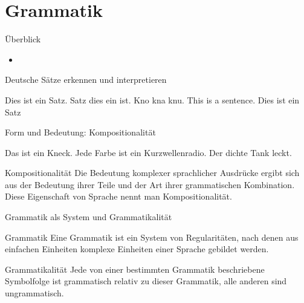 \section{Grammatik}


\begin{frame}
  {Überblick}
  \begin{itemize}[<+->]
    \item \citet{Schaefer2018b}
  \end{itemize}
\end{frame}

\begin{frame}
  {Deutsche Sätze erkennen und interpretieren}
  \pause
  \begin{exe}
    \ex Dies ist ein Satz.
  \pause
    \ex Satz dies ein ist.
  \pause
    \ex Kno kna knu.
  \pause
    \ex This is a sentence.
  \pause
    \vspace{\baselineskip}
    \ex Dies ist ein Satz
  \end{exe}
\end{frame}


\begin{frame}
  {Form und Bedeutung: Kompositionalität}
  \begin{exe}
    \ex Das ist ein Kneck.
    \pause
    \vspace{\baselineskip}
  \ex Jede Farbe ist ein Kurzwellenradio.
  \ex Der dichte Tank leckt.
\end{exe}
    \vspace{\baselineskip}
  \pause

  \Large\begin{block}{Kompositionalität}
    Die Bedeutung komplexer sprachlicher Ausdrücke ergibt sich aus der Bedeutung ihrer Teile und der Art ihrer grammatischen Kombination. 
    Diese Eigenschaft von Sprache nennt man Kompositionalität.
  \end{block}
\end{frame}

\begin{frame}
  {Grammatik als System und Grammatikalität}
  \pause

  \Large\begin{block}{Grammatik}
    Eine Grammatik ist ein \alert{System von Regularitäten}, nach denen aus einfachen Einheiten komplexe Einheiten einer Sprache gebildet werden.
  \end{block}
  \vspace{\baselineskip}

  \pause

  \begin{block}{Grammatikalität}
    Jede von einer bestimmten Grammatik beschriebene Symbolfolge ist \alert{grammatisch} relativ zu dieser Grammatik, alle anderen sind \alert{ungrammatisch}.
  \end{block}
\end{frame}

